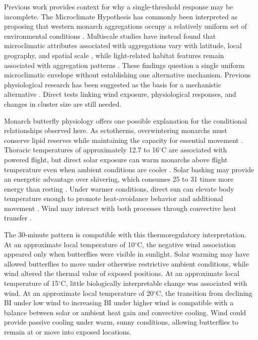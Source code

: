 \documentclass[insects,article,submit,pdftex,moreauthors]{Definitions/mdpi}
\begin{document}
Previous work provides context for why a single-threshold response may be incomplete. The Microclimate Hypothesis has commonly been interpreted as proposing that western monarch aggregations occupy a relatively uniform set of environmental conditions \cite{leongMicroenvironmentalFactorsAssociated1990,leongUseMultivariateAnalyses1991}. Multiscale studies have instead found that microclimatic attributes associated with aggregations vary with latitude, local geography, and spatial scale \cite{sanieeHierarchyScaleInfluence2022,fisherMultiScaleSpeciesDistribution2024}, while light-related habitat features remain associated with aggregation patterns \cite{weissForestCanopyStructure1991,ibsenDensityDependenceHabitat2026,sanieeHierarchyScaleInfluence2022}. These findings question a single uniform microclimatic envelope without establishing one alternative mechanism. Previous physiological research \cite{mastersMonarchButterflyDanaus1988,kammerThoracicTemperatureShivering1970,barkerEffectPhotoperiodTemperature1976,chaplinEnergyReservesMetabolic1982} has been suggested as the basis for a mechanistic alternative \cite{sanieeHierarchyScaleInfluence2022}. Direct tests linking wind exposure, physiological responses, and changes in cluster size are still needed.

Monarch butterfly physiology offers one possible explanation for the conditional relationships observed here. As ectotherms, overwintering monarchs must conserve lipid reserves while maintaining the capacity for essential movement \cite{chaplinEnergyReservesMetabolic1982,mastersMonarchButterflyDanaus1988}. Thoracic temperatures of approximately 12.7 to 16$^{\circ}$C are associated with powered flight, but direct solar exposure can warm monarchs above flight temperature even when ambient conditions are cooler \cite{mastersMonarchButterflyDanaus1988}. Solar basking may provide an energetic advantage over shivering, which consumes 25 to 31 times more energy than resting \cite{kammerThoracicTemperatureShivering1970}. Under warmer conditions, direct sun can elevate body temperature enough to promote heat-avoidance behavior and additional movement \cite{barkerEffectPhotoperiodTemperature1976,mastersMonarchButterflyDanaus1988}. Wind may interact with both processes through convective heat transfer \cite{riddellWindNicheThermal2025,munroClimateStrongPredictor2019,tsaiPhysicalBehavioralAdaptations2020,krishnaAirTemperatureDrives2021}.

The 30-minute pattern is compatible with this thermoregulatory interpretation. At an approximate local temperature of 10$^{\circ}$C, the negative wind association appeared only when butterflies were visible in sunlight. Solar warming may have allowed butterflies to move under otherwise restrictive ambient conditions, while wind altered the thermal value of exposed positions. At an approximate local temperature of 15$^{\circ}$C, little biologically interpretable change was associated with wind. At an approximate local temperature of 20$^{\circ}$C, the transition from declining BI under low wind to increasing BI under higher wind is compatible with a balance between solar or ambient heat gain and convective cooling. Wind could provide passive cooling under warm, sunny conditions, allowing butterflies to remain at or move into exposed locations.
\end{document}
